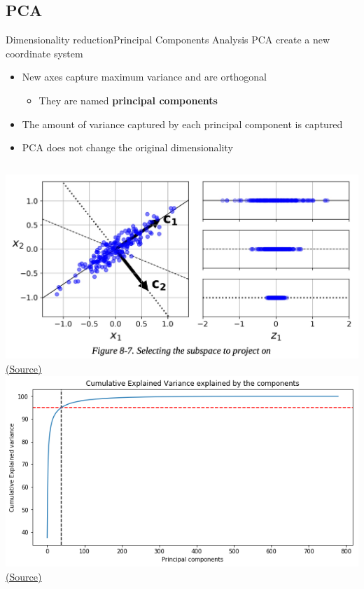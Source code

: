 \documentclass[10pt,compress]{beamer} %
\begin{document}
\subsection{PCA}

\begin{frame}{Dimensionality reduction}{Principal Components Analysis}
	PCA create a new coordinate system
    \begin{itemize}
        \item New axes capture maximum variance and are orthogonal
            \begin{itemize}
            \item They are named \textbf{principal components}
            \end{itemize}
        \item The amount of variance captured by each principal component is captured
        \item PCA does not change the original dimensionality
    \end{itemize}

    \begin{columns}
			\includegraphics[width=\linewidth]{figs/2d_variance_projection.png}
    		\centering \tiny{\href{https://github.com/Akramz/Hands-on-Machine-Learning-with-Scikit-Learn-Keras-and-TensorFlow/blob/master/08.Dim_Reduction.ipynb}{(Source)}}
	        \includegraphics[width=\linewidth]{figs/pcavariance.png}
    		\centering \tiny{\href{https://www.kaggle.com/code/mirzarahim/introduction-to-pca-image-compression-example}{(Source)}}
    \end{columns}
\end{frame}
\end{document}

